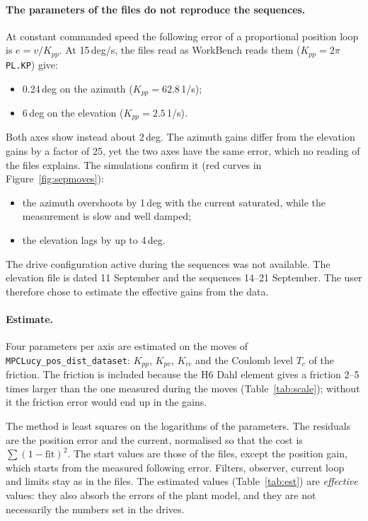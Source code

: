 \documentclass[10pt,a4paper]{article}
\numberwithin{equation}{section}
\begin{document}
\paragraph{The parameters of the files do not reproduce the sequences.} At constant commanded speed the following error of a proportional position loop is $e=v/K_{pp}$. At 15\,deg/s, the files read as WorkBench reads them ($K_{pp}=2\pi\,$\texttt{PL.KP}) give:
\begin{itemize}
\item 0.24\,deg on the azimuth ($K_{pp}=62.8$\,1/s);
\item 6\,deg on the elevation ($K_{pp}=2.5$\,1/s).
\end{itemize}
Both axes show instead about 2\,deg. The azimuth gains differ from the elevation gains by a factor of 25, yet the two axes have the same error, which no reading of the files explains. The simulations confirm it (red curves in Figure~\ref{fig:sepmoves}):
\begin{itemize}
\item the azimuth overshoots by 1\,deg with the current saturated, while the measurement is slow and well damped;
\item the elevation lags by up to 4\,deg.
\end{itemize}
The drive configuration active during the sequences was not available. The elevation file is dated 11 September and the sequences 14--21 September. The user therefore chose to estimate the effective gains from the data.

\paragraph{Estimate.} Four parameters per axis are estimated on the moves of \texttt{MPCLucy\_pos\_dist\_dataset}: $K_{pp}$, $K_{pv}$, $K_{iv}$ and the Coulomb level $T_c$ of the friction. The friction is included because the H6 Dahl element gives a friction 2--5 times larger than the one measured during the moves (Table~\ref{tab:scale}); without it the friction error would end up in the gains.

The method is least squares on the logarithms of the parameters. The residuals are the position error and the current, normalised so that the cost is $\sum(1-\mathrm{fit})^2$. The start values are those of the files, except the position gain, which starts from the measured following error. Filters, observer, current loop and limits stay as in the files. The estimated values (Table~\ref{tab:est}) are \emph{effective} values: they also absorb the errors of the plant model, and they are not necessarily the numbers set in the drives.
\end{document}
